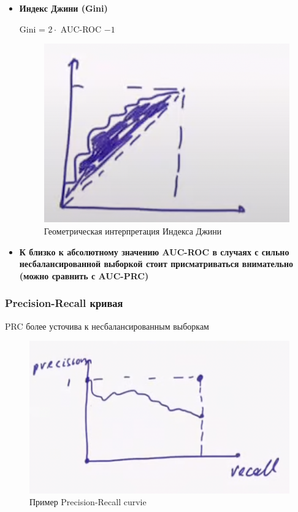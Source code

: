         \begin{center}
        \end{center}
        \begin{itemize}
            \item \textbf{Индекс Джини (Gini)}\\
                \begin{center}
                    Gini = $2 \cdot$ AUC-ROC $- 1$
                \end{center}

                \begin{figure}[H]
                    \centering
                    \includegraphics[width=0.3 \textwidth]{images/5lecture/GiniIndex.png}
                    \caption{Геометрическая интерпретация Индекса Джини}
                \end{figure}


            \item \textbf{К близко к абсолютному значению AUC-ROC в случаях с сильно несбалансированной выборкой стоит присматриваться внимательно (можно сравнить с AUC-PRC)}\\
        \end{itemize}


        \subsubsection{Precision-Recall кривая}

        PRC более усточива к несбалансированным выборкам
            \begin{figure}[H]
                \centering
                \includegraphics[width=0.4 \textwidth]{images/5lecture/PresicionRecallCurvie.png}
                \caption{Пример Precision-Recall curvie}
            \end{figure}

